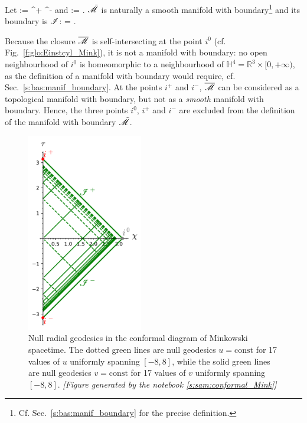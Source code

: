 Let
\be
    \scri := \scri^+ \cup \scri^-
\ee
and
\be \label{e:glo:def_tM_Mink}
    \tilde{\M} := \M \cup \scri .
\ee
$\tilde{\mathscr{M}}$ is naturally a smooth manifold with
boundary\footnote{Cf. Sec.~\ref{s:bas:manif_boundary} for the precise definition.}
and its boundary is $\mathscr{I}$:
\be
    \partial \tilde{\M} = \scri.
\ee
\begin{remark}
Because the closure $\overline{\mathscr{M}}$ is self-intersecting at the point $i^0$
(cf. Fig.~\ref{f:glo:Einstcyl_Mink}), it is not a manifold with boundary: no open neighbourhood of
$i^0$ is homeomorphic to a neighbourhood of
$\mathbb{H}^4 = \mathbb{R}^3\times {[0,+\infty)}$,
as the definition of a manifold with boundary would
require, cf. Sec.~\ref{s:bas:manif_boundary}.
At the points $i^+$ and $i^-$, $\overline{\mathscr{M}}$ can be considered as a
topological manifold with boundary, but not as a \emph{smooth} manifold with boundary.
Hence, the three points $i^0$, $i^+$ and $i^-$ are excluded from the definition
of the manifold with boundary $\tilde{\mathscr{M}}$.
\end{remark}

\begin{figure}
\centerline{\includegraphics[width=0.45\textwidth]{glo_conf_Mink_null.pdf}}
\caption[]{\label{f:glo:conf_Mink_null}\footnotesize
Null radial geodesics in the conformal diagram of Minkowski spacetime.
The dotted green lines are null geodesics $u=\mathrm{const}$ for
17 values of $u$ uniformly spanning $[-8,8]$, while the solid green lines are
null geodesics $v=\mathrm{const}$ for 17 values of $v$ uniformly spanning $[-8,8]$.
\textsl{[Figure generated by the notebook \ref{s:sam:conformal_Mink}]}
}
\end{figure}

